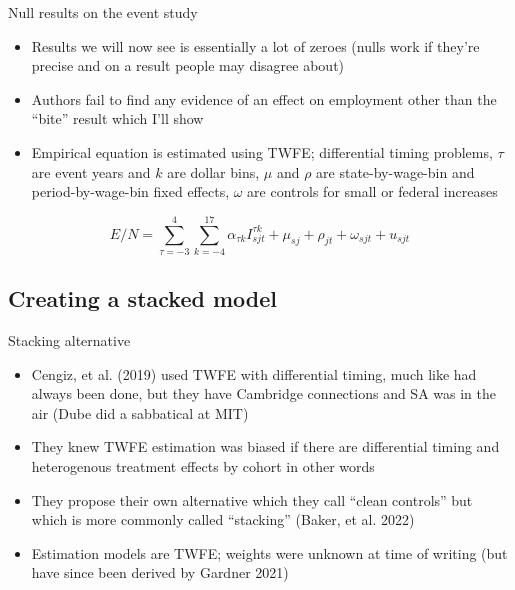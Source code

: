 \documentclass{beamer}
\begin{document}
\begin{frame}{Null results on the event study}

\begin{itemize}
\item Results we will now see is essentially a lot of zeroes (nulls work if they're precise and on a result people may disagree about)
\item Authors fail to find any evidence of an effect on employment other than the ``bite'' result which I'll show
\item Empirical equation is estimated using TWFE; differential timing problems, $\tau$ are event years and $k$ are dollar bins, $\mu$ and $\rho$ are state-by-wage-bin and period-by-wage-bin fixed effects, $\omega$ are controls for small or federal increases
\end{itemize}

\begin{equation}
E/N = \sum_{\tau=-3}^4 \sum_{k=-4}^{17} \alpha_{\tau k}I^{\tau k}_{sjt} + \mu_{sj} + \rho_{jt} + \omega_{sjt} + u_{sjt}
\end{equation}

\end{frame}



\subsection{Creating a stacked model}

\begin{frame}{Stacking alternative}

\begin{itemize}
\item Cengiz, et al. (2019) used TWFE with differential timing, much like had always been done, but they have Cambridge connections and SA was in the air (Dube did a sabbatical at MIT)
\item They knew TWFE estimation was biased if there are differential timing and heterogenous treatment effects by cohort in other words
\item They propose their own alternative which they call ``clean controls'' but which is more commonly called ``stacking'' (Baker, et al. 2022)
\item Estimation models are TWFE; weights were unknown at time of writing (but have since been derived by Gardner 2021)
\end{itemize}

\end{frame}
\end{document}
